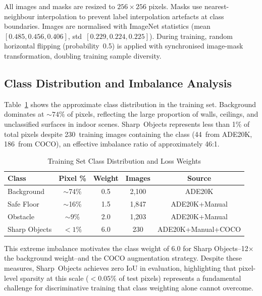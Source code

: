 All images and masks are resized to $256{\times}256$ pixels.
Masks use nearest-neighbour interpolation to prevent label
interpolation artefacts at class boundaries. Images are normalised
with ImageNet statistics (mean~$[0.485, 0.456, 0.406]$,
std~$[0.229, 0.224, 0.225]$). During training, random horizontal
flipping (probability~0.5) is applied with synchronised image-mask
transformation, doubling training sample diversity.

\subsection{Class Distribution and Imbalance Analysis}

Table~\ref{tab:class_dist} shows the approximate class distribution
in the training set. Background dominates at ${\sim}74\%$ of pixels,
reflecting the large proportion of walls, ceilings, and
unclassified surfaces in indoor scenes. Sharp~Objects represents
less than 1\% of total pixels despite 230~training images
containing the class (44~from ADE20K, 186~from COCO), an effective
imbalance ratio of approximately 46:1.

\begin{table}[h]
\centering
\caption{Training Set Class Distribution and Loss Weights}
\label{tab:class_dist}
\begin{tabular}{lcccc}
\toprule
\textbf{Class} & \textbf{Pixel \%} & \textbf{Weight} & \textbf{Images} & \textbf{Source} \\
\midrule
Background & $\sim$74\% & 0.5 & 2,100 & ADE20K \\
Safe Floor & $\sim$16\% & 1.5 & 1,847 & ADE20K+Manual \\
Obstacle & $\sim$9\% & 2.0 & 1,203 & ADE20K+Manual \\
Sharp Objects & $<1\%$ & 6.0 & 230 & ADE20K+Manual+COCO \\
\bottomrule
\end{tabular}
\end{table}

This extreme imbalance motivates the class weight of 6.0 for Sharp
Objects--12$\times$ the background weight--and the COCO augmentation
strategy. Despite these measures, Sharp~Objects achieves zero IoU
in evaluation, highlighting that pixel-level sparsity at this
scale ($<0.05\%$ of test pixels) represents a fundamental challenge
for discriminative training that class weighting alone cannot overcome.
